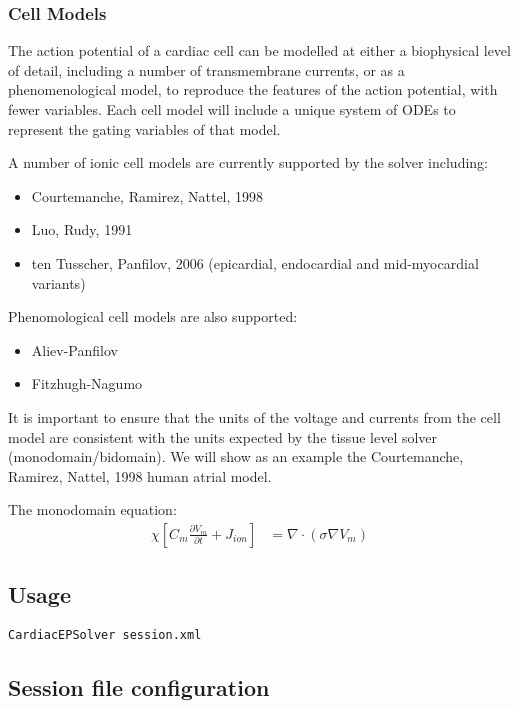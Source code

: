 \subsubsection{Cell Models}
The action potential of a cardiac cell can be modelled at either a biophysical
level of detail, including a number of transmembrane currents, or as a
phenomenological model, to reproduce the features of the action potential, with
fewer variables. Each cell model will include a unique system of ODEs to
represent the gating variables of that model.

A number of ionic cell models are currently supported by the solver including:
\begin{itemize}
    \item Courtemanche, Ramirez, Nattel, 1998 
    \item Luo, Rudy, 1991
    \item ten Tusscher, Panfilov, 2006 (epicardial, endocardial and
    mid-myocardial variants)
\end{itemize}

Phenomological cell models are also supported:
\begin{itemize}
    \item Aliev-Panfilov
    \item Fitzhugh-Nagumo
\end{itemize}

It is important to ensure that the units of the voltage and currents from the
cell model are consistent with the units expected by the tissue level solver
(monodomain/bidomain). We will show as an example the Courtemanche, Ramirez,
Nattel, 1998 human atrial model.

The monodomain equation:
\begin{align*}
\chi \left[ C_m \frac{\partial V_m}{\partial t} + J_{ion} \right] &= \nabla \cdot (\sigma \nabla V_m)
\end{align*}

\subsection{Usage}
\lstinline[style=BashInputStyle]{CardiacEPSolver session.xml}

\subsection{Session file configuration}
